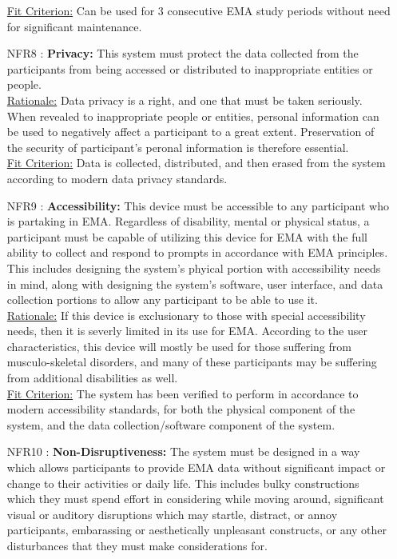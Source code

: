 \documentclass[12pt]{article}
\begin{document}
\begin{itemize}
\underline{Fit Criterion:} Can be used for 3 consecutive EMA study periods without need for significant maintenance.\\

\item[NFR8 \label{NFR8}:]
  \textbf{Privacy:} This system must protect the data collected from the participants from being accessed or distributed to inappropriate entities or people. \\


\underline{Rationale:} Data privacy is a right, and one that must be taken seriously. When revealed to inappropriate people or entities, personal information can be used to negatively affect a participant to a great extent. Preservation of the security of participant's peronal information is therefore essential.\\

\underline{Fit Criterion:} Data is collected, distributed, and then erased from the system according to modern data privacy standards.\\

\item[NFR9 \label{NFR9}:]
  \textbf{Accessibility:} This device must be accessible to any participant who is partaking in EMA. Regardless of disability, mental or physical status, a participant must be capable of utilizing this device for EMA with the full ability to collect and respond to prompts in accordance with EMA principles. This includes designing the system's phyical portion with accessibility needs in mind, along with designing the system's software, user interface, and data collection portions to allow any participant to be able to use it.\\

\underline{Rationale:} If this device is exclusionary to those with special accessibility needs, then it is severly limited in its use for EMA. According to the user characteristics, this device will mostly be used for those suffering from musculo-skeletal disorders, and many of these participants may be suffering from additional disabilities as well.\\

\underline{Fit Criterion:} The system has been verified to perform in accordance to modern accessibility standards, for both the physical component of the system, and the data collection/software component of the system.\\

\item[NFR10 \label{NFR10}:]
  \textbf{Non-Disruptiveness:} The system must be designed in a way which allows participants to provide EMA data without significant impact or change to their activities or daily life. This includes bulky constructions which they must spend effort in considering while moving around, significant visual or auditory disruptions which may startle, distract, or annoy participants, embarassing or aesthetically unpleasant constructs, or any other disturbances that they must make considerations for.\\


\end{itemize}
\end{document}
